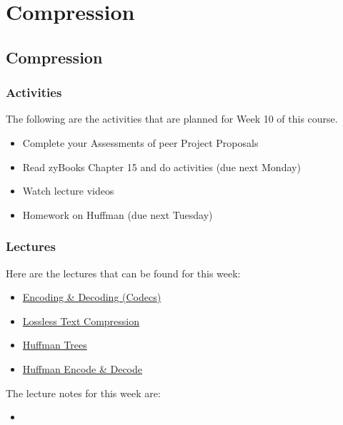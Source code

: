 \clearpage

\renewcommand{\ChapTitle}{Compression}

\chapter{\ChapTitle}
\section{\ChapTitle}

\subsection{Activities}

The following are the activities that are planned for Week 10 of this course.

\begin{itemize}
    \item Complete your Assessments of peer Project Proposals
    \item Read zyBooks Chapter 15 and do activities (due next Monday)
    \item Watch lecture videos
    \item Homework on Huffman (due next Tuesday)
\end{itemize}

\subsection{Lectures}

Here are the lectures that can be found for this week:

\begin{itemize}
    \item \href{https://applied.cs.colorado.edu/mod/hvp/view.php?id=46028}{Encoding \& Decoding (Codecs)}
    \item \href{https://applied.cs.colorado.edu/mod/hvp/view.php?id=46029}{Lossless Text Compression}
    \item \href{https://applied.cs.colorado.edu/mod/hvp/view.php?id=46030}{Huffman Trees}
    \item \href{https://applied.cs.colorado.edu/mod/hvp/view.php?id=46031}{Huffman Encode \& Decode}
\end{itemize}

\noindent The lecture notes for this week are:

\begin{itemize}
    \item {}
\end{itemize}

